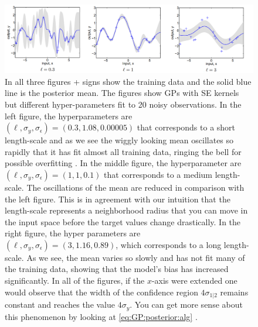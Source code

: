 \documentclass[10pt]{article}
\theoremstyle{definition}
\begin{document}
\begin{figure}[t!]
\centering
\includegraphics[width=17cm]{figs/length-scale.png}
\caption{In all three figures + signs show the training data and the solid blue line is the posterior mean. The figures show GPs with SE kernels but different hyper-parameters fit to 20 noisy observations. In the left figure, the hyperparameters are $(\ell, \sigma_y, \sigma_{\epsilon})=(0.3, 1.08, 0.00005)$ that corresponds to a short length-scale and as we see the wiggly looking mean oscillates so rapidly that it has fit almost all training data, ringing the bell for possible overfitting . In the middle figure, the hyperparameter are $(\ell, \sigma_y, \sigma_{\epsilon})=(1, 1, 0.1)$ that corresponds to a medium length-scale. The oscillations of the mean are reduced in comparison with the left figure. This is in agreement with our intuition that the length-scale represents a neighborhood radius that you can move in the input space before the target values change drastically. In the right figure, the hyper parameters are  $(\ell, \sigma_y, \sigma_{\epsilon})=(3, 1.16, 0.89)$, which corresponds to a long length-scale. As we see, the mean varies so slowly and has not fit many of the training data, showing that the model's bias has increased significantly. In all of the figures, if the $x$-axis were extended one would observe that the width of the confidence region $4\sigma_{1|2}$ remains constant and reaches the value $4\sigma_y$. You can get more sense about this phenomenon by looking at \cref{eq:GP:posterior:alg} \cite{Rasmussen2006}.}
\label{fig:length:scale}
\end{figure}
\end{document}

